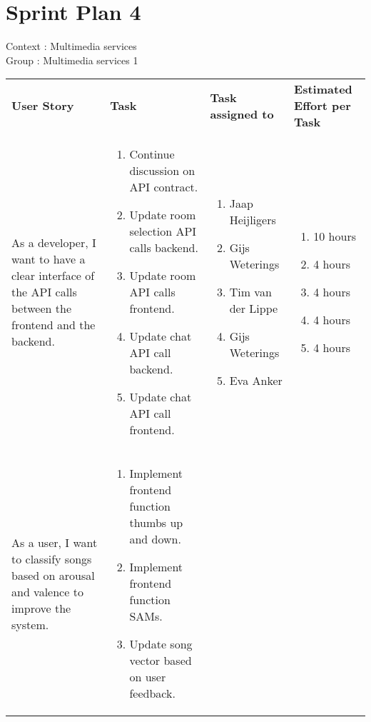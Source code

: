 \documentclass[11pt,a4paper]{article}
\begin{document}
\section*{Sprint Plan 4}
Context : Multimedia services\\
Group : Multimedia services 1\\



\begin{table}[h]
\begin{tabular}{|p{4.5cm}|p{7cm}|p{4cm}|p{2.6cm}|}
\textbf{User Story} & \textbf{Task} & \textbf{Task assigned to} & \textbf{Estimated Effort per Task} \\


As a developer, I want to have a clear interface of the API calls between the frontend and the backend.

&
\begin{enumerate}
\item Continue discussion on API contract.
\item Update room selection API calls backend.
\item Update room API calls frontend.
\item Update chat API call backend.
\item Update chat API call frontend.
\end{enumerate}

& 
\begin{enumerate}
\item Jaap Heijligers
\item Gijs Weterings
\item Tim van der Lippe
\item Gijs Weterings
\item Eva Anker
\end{enumerate}

& 
\begin{enumerate}
\item 10 hours
\item 4 hours
\item 4 hours
\item 4 hours
\item 4 hours
\end{enumerate}
\\

As a user, I want to classify songs based on arousal and valence to improve the system.

&
\begin{enumerate}
\item Implement frontend function thumbs up and down.
\item Implement frontend function SAMs.
\item Update song vector based on user feedback.
\end{enumerate}


\end{tabular}
\end{table}
\end{document}

